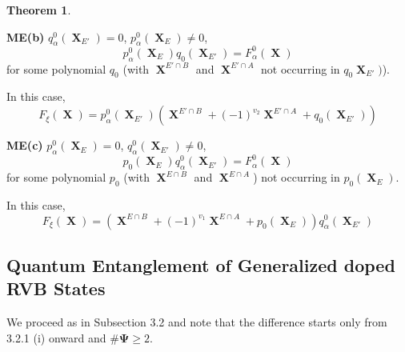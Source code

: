 \documentclass[a4paper,12pt]{article}
\DeclareMathOperator{\x}{\mathrm{X}}
\theoremstyle{definition}
\theoremstyle{underlinethm}
\newtheorem{thm}{Theorem}[section]
\theoremstyle{definition}
\begin{document}
\begin{thm}
\begin{enumerate}[label = (\roman*)]
\textbf{ME(b)} $q_{\alpha}^{0} (\boldsymbol{\x}_{E'}) = 0$, $p_{\alpha}^{0}(\boldsymbol{\x}_{E}) \neq 0$,
\begin{equation}
p_{\alpha}^{0}(\boldsymbol{\x}_{E}) q_{0}(\boldsymbol{\x}_{E'}) = F_{\alpha}^{0} (\boldsymbol{\x}) \tag{4.47}\label{eq-4.47}
\end{equation}
for some polynomial $q_{0}$ (with $\boldsymbol{\x}^{E' \cap B}$ and $\boldsymbol{\x}^{E' \cap A}$ not occurring in $q_{0}\boldsymbol{\x}_{E'})$).

In this case, \begin{equation}F_{\xi}(\boldsymbol{\x}) = p_{\alpha}^{0} (\boldsymbol{\x}_{E'}) \left(\boldsymbol{\x}^{E' \cap B} + (-1)^{v_{2}} \boldsymbol{\x}^{E' \cap A}  + q_{0} (\boldsymbol{\x}_{E'})\right)\tag{4.48}\label{eq-4.48}\end{equation}

\textbf{ME(c)} $p_{\alpha}^{0} (\boldsymbol{\x}_{E})= 0$, $q_{\alpha}^{0} (\boldsymbol{\x}_{E'}) \neq 0$,
\begin{equation}
p_{0}(\boldsymbol{\x}_{E}) q_{\alpha}^{0}(\boldsymbol{\x}_{E'}) = F_{\alpha}^{0}(\boldsymbol{\x})\tag{4.49}\label{eq-4.49}
\end{equation} 
for some polynomial $p_{0}$ (with $\boldsymbol{\x}^{E \cap B}$ and $\boldsymbol{\x}^{E \cap A}$) not occurring in $p_{0}(\boldsymbol{\x}_{E})$.

In this case, 
\begin{equation}
F_{\xi}(\boldsymbol{\x}) = \left(\boldsymbol{\x}^{E \cap B} + (-1)^{v_{1}} \boldsymbol{\x}^{E \cap A} + p_{0} (\boldsymbol{\x}_{E}) \right) q_{\alpha}^{0}(\boldsymbol{\x}_{E'})\tag{4.50} \label{eq-4.50}
\end{equation}

\end{enumerate}

\end{thm}

\subsection{Quantum Entanglement of Generalized doped RVB States}\label{subsection-4.4}

We proceed as in Subsection 3.2 and note that the difference starts only from 3.2.1 (i) onward and $\# \boldsymbol{\Psi} \geq 2$.
\end{document}
